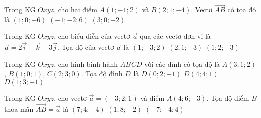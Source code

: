 \begin{ex}%
Trong KG $Oxyz$, cho hai điểm $A(1; -1; 2)$ và $B(2; 1; -4)$. Vectơ $\overrightarrow{AB}$ có tọa độ là
 {$(1; 0; -6)$}
 {$(-1; -2; 6)$}
 {$(3; 0; -2)$}
\end{ex}

\begin{ex}%
Trong KG $Oxyz$, cho biểu diễn của vectơ $\overrightarrow{a}$ qua các vectơ đơn vị là $\overrightarrow{a}=2\overrightarrow{i}+\overrightarrow{k}-3\overrightarrow{j}$. Tọa độ của vectơ $\overrightarrow{a}$ là
 {$(1; -3; 2)$}
 {$(2; 1; -3)$}
 {$(1; 2; -3)$}
\end{ex}

\begin{ex}%
Trong KG $Oxyz$, cho hình bình hành $ABCD$ với các đỉnh có tọa độ là $A(3; 1; 2)$, $B(1; 0; 1)$, $C(2; 3; 0)$. Tọa độ đỉnh $D$ là
 {$D(0; 2; -1)$}
 {\True $D(4; 4; 1)$}
 {$D(1; 3; -1)$}
\end{ex}

\begin{ex}%
Trong KG $Oxyz$, cho vectơ $\overrightarrow{a}=(-3; 2; 1)$ và điểm $A(4; 6; -3)$. Tọa độ điểm $B$ thỏa mãn $\overrightarrow{AB}=\overrightarrow{a}$ là
 {$(7; 4; -4)$}
 {\True $(1; 8; -2)$}
 {$(-7; -4; 4)$}
\end{ex}

